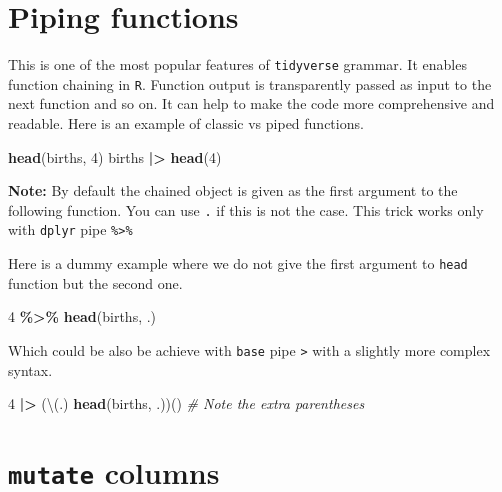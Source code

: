 \documentclass[
]{book}
\newenvironment{Shaded}{\begin{snugshade}}{\end{snugshade}}
\newcommand{\CommentTok}[1]{\textcolor[rgb]{0.56,0.35,0.01}{\textit{#1}}}
\newcommand{\DecValTok}[1]{\textcolor[rgb]{0.00,0.00,0.81}{#1}}
\newcommand{\FunctionTok}[1]{\textcolor[rgb]{0.13,0.29,0.53}{\textbf{#1}}}
\newcommand{\NormalTok}[1]{#1}
\newcommand{\SpecialCharTok}[1]{\textcolor[rgb]{0.81,0.36,0.00}{\textbf{#1}}}
\begin{document}
\section{Piping functions}\label{piping-functions}

This is one of the most popular features of \texttt{tidyverse} grammar. It enables function chaining in
\texttt{R}. Function output is transparently passed as input to the next function and so on.
It can help to make the code more comprehensive and readable.
Here is an example of classic vs piped functions.

\begin{Shaded}
\begin{Highlighting}[]
\FunctionTok{head}\NormalTok{(births, }\DecValTok{4}\NormalTok{)}
\NormalTok{births }\SpecialCharTok{|\textgreater{}} \FunctionTok{head}\NormalTok{(}\DecValTok{4}\NormalTok{)}
\end{Highlighting}
\end{Shaded}

\textbf{Note:} By default the chained object is given as the first argument to the following
function.
You can use \texttt{.} if this is not the case. This trick works only with \texttt{dplyr} pipe \texttt{\%\textgreater{}\%}

Here is a dummy example where we do not give the first argument to \texttt{head} function but the second one.

\begin{Shaded}
\begin{Highlighting}[]
\DecValTok{4} \SpecialCharTok{\%\textgreater{}\%} \FunctionTok{head}\NormalTok{(births, .)}
\end{Highlighting}
\end{Shaded}

Which could be also be achieve with \texttt{base} pipe \texttt{\textbar{}\textgreater{}} with a slightly more complex syntax.

\begin{Shaded}
\begin{Highlighting}[]
\DecValTok{4} \SpecialCharTok{|\textgreater{}}\NormalTok{ (\textbackslash{}(.) }\FunctionTok{head}\NormalTok{(births, .))() }\CommentTok{\# Note the extra parentheses}
\end{Highlighting}
\end{Shaded}

\section{\texorpdfstring{\texttt{mutate} columns}{mutate columns}}\label{mutate-columns}
\end{document}
